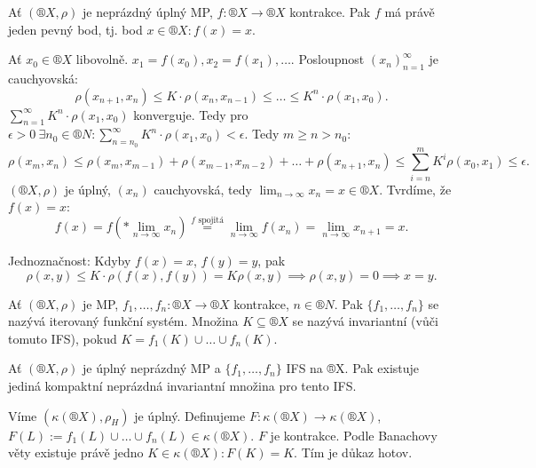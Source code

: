 \documentclass[12pt]{article}					%
\begin{document}
        \begin{veta}
            Ať $(®X, \rho)$ je neprázdný úplný MP, $f: ®X \rightarrow ®X$ kontrakce. Pak $f$ má právě jeden pevný bod, tj. bod $x \in ®X: f(x) = x$.

            \begin{dukazin}
                Ať $x_0 \in ®X$ libovolně. $x_1 = f(x_0), x_2 = f(x_1), …$. Posloupnost $(x_n)_{n=1}^∞$ je cauchyovská:
                $$ \rho(x_{n+1}, x_n) ≤ K·\rho(x_n, x_{n-1}) ≤ … ≤ K^n·\rho(x_1, x_0). $$
                $\sum_{n=1}^∞ K^n·\rho(x_1, x_0)$ konverguje. Tedy pro $\epsilon > 0\ \exists n_0 \in ®N: \sum_{n=n_0}^∞ K^n·\rho(x_1, x_0) < \epsilon$. Tedy $m ≥ n > n_0$:
                $$ \rho(x_m, x_n) ≤ \rho(x_m, x_{m-1}) + \rho(x_{m-1}, x_{m-2}) + … + \rho(x_{n+1}, x_n) ≤ \sum_{i=n}^m K^i \rho(x_0, x_1) ≤ \epsilon. $$ 
                $(®X, \rho)$ je úplný, $(x_n)$ cauchyovská, tedy $\lim_{n \rightarrow ∞} x_n = x \in ®X$. Tvrdíme, že $f(x) = x$:
                $$ f(x) = f(*\lim_{n \rightarrow ∞} x_n) \overset{\text{$f$ spojitá}}{=} \lim_{n \rightarrow ∞} f(x_n) = \lim_{n \rightarrow ∞} x_{n+1} = x. $$

                Jednoznačnost: Kdyby $f(x) = x$, $f(y) = y$, pak
                $$ \rho(x, y) ≤ K·\rho(f(x), f(y)) = K\rho(x, y) \implies \rho(x, y) = 0 \implies x = y. $$ 
            \end{dukazin}
        \end{veta}

        \begin{definice}
            Ať $(®X, \rho)$ je MP, $f_1, …, f_n: ®X \rightarrow ®X$ kontrakce, $n \in ®N$. Pak $\{f_1, …, f_n\}$ se nazývá iterovaný funkční systém. Množina $K \subseteq ®X$ se nazývá invariantní (vůči tomuto IFS), pokud $K = f_1(K) \cup … \cup f_n(K)$.
        \end{definice}

        \begin{veta}
            Ať $(®X, \rho)$ je úplný neprázdný MP a $\{f_1, …, f_n\}$ IFS na ®X. Pak existuje jediná kompaktní neprázdná invariantní množina pro tento IFS.

            \begin{dukazin}
                Víme $(\kappa(®X), \rho_H)$ je úplný. Definujeme $F: \kappa(®X) \rightarrow \kappa(®X)$, $F(L):=f_1(L) \cup … \cup f_n(L) \in \kappa(®X)$. $F$ je kontrakce. Podle Banachovy věty existuje právě jedno $K \in \kappa(®X): F(K) = K$. Tím je důkaz hotov.
            \end{dukazin}
        \end{veta}
\end{document}
